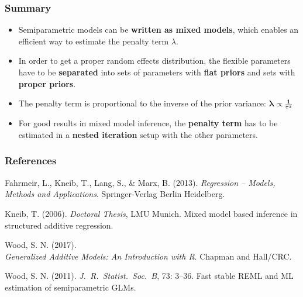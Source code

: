 \documentclass[final]{beamer}
\begin{document}
\begin{frame}
\frametitle{Summary}

\begin{itemize}
\item Semiparametric models can be \textbf{written as mixed models}, which enables an efficient way to estimate the penalty term $\lambda$.
\item In order to get a proper random effects distribution, the flexible parameters have to be \textbf{separated} into sets of parameters with \textbf{flat priors} and sets with \textbf{proper priors}.
\item The penalty term  is proportional to the inverse of the prior variance: $\mathbf{\boldsymbol{\lambda} \boldsymbol{\propto} \frac{1}{\boldsymbol{\tau}^2}}$
\item For good results in mixed model inference, the \textbf{penalty term} has to be estimated in a \textbf{nested iteration} setup with the other parameters.
\end{itemize}

\end{frame}


\appendix
\begin{frame}
\frametitle{References}
				\begin{thebibliography}{10}
				
Fahrmeir, L., Kneib, T., Lang, S., \&  Marx, B. (2013). {\em Regression -- Models, Methods and Applications}.
\newblock Springer-Verlag Berlin Heidelberg.

Kneib, T. (2006). {\em Doctoral Thesis}, LMU Munich.
\newblock Mixed model based inference in structured additive regression.

Wood, S. N. (2017). \\ {\em Generalized Additive Models: An Introduction with R}.
\newblock Chapman and Hall/CRC.

Wood, S. N. (2011). {\em J.\ R.\ Statist.\ Soc.\ B}, 73: 3--36.
\newblock Fast stable REML and ML estimation of semiparametric GLMs.

\end{thebibliography}
\end{frame}
\end{document}

